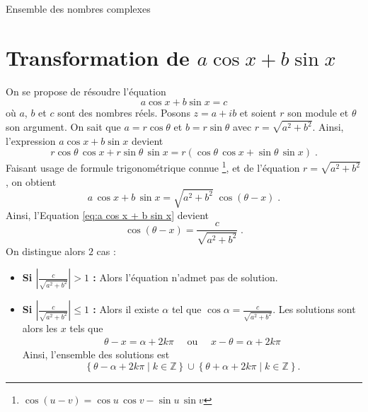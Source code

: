 \begin{chapter}{Ensemble des nombres complexes}
\section{Transformation de $a \cos x + b \sin x$}
%
%
On se propose de r\'esoudre l'\'equation 
\begin{equation}
a \cos x + b \sin x = c
\label{eq:a cos x + b sin x}
\end{equation}
o\`u $a$, $b$ et $c$ sont des nombres r\'eels.
Posons $z = a+ i b $ et soient $r$ son module et $\theta$ son argument.
On sait que $ a = r \cos \theta$ et $b = r \sin \theta$ avec $r = \sqrt{a^2 + b^2}$.
Ainsi, l'expression $a \cos x + b \sin x $ devient
$$
r \cos \theta \, \cos x + r \sin \theta \, \sin x = r \left( \cos \theta \, \cos x + \sin \theta \, \sin x \right) \; .
$$
Faisant usage de formule trigonom\'etrique connue \footnote{$\cos( u - v ) = \cos u \, \cos v - \sin u \, \sin v$}, et de l'\'equation $r = \sqrt{a^2 + b^2}$, on obtient
$$
a \, \cos x + b \, \sin x = \sqrt{a^2 + b^2} \; \cos (\theta - x) \; .
$$
Ainsi, l'Equation \ref{eq:a cos x + b sin x} devient 
\begin{equation}
\cos (\theta - x) = \frac{c}{\sqrt{a^2 + b^2}} \; .
\label{eq:cos (theta - x) = c/r}
\end{equation}
On distingue alors $2$ cas : 
\begin{itemize}
\item \textbf{ Si $ \left| \frac{c}{\sqrt{a^2 + b^2}} \right| > 1$ : } \newline
      Alors l'\'equation n'admet pas de solution.
\item \textbf{ Si $ \left| \frac{c}{\sqrt{a^2 + b^2}} \right| \leq 1$ : } \newline
      Alors il existe $\alpha$ tel que $\cos \alpha =  \frac{c}{\sqrt{a^2 + b^2}} $.
      Les solutions sont alors les $x$ tels que 
      \begin{align*}
      \theta - x = \alpha + 2 k \pi 
      \quad \text{ ou } \quad
      x - \theta = \alpha + 2 k \pi
      \end{align*}
      Ainsi, l'ensemble des solutions est
      \[
      \left\lbrace \theta - \alpha + 2 k \pi \mid k \in \mathbb{Z} \right\rbrace 
      \cup 
      \left\lbrace \theta + \alpha + 2 k \pi \mid k \in \mathbb{Z} \right\rbrace
      .
      \]
\end{itemize}
%
\begin{ex}

\end{ex}
\end{chapter}
